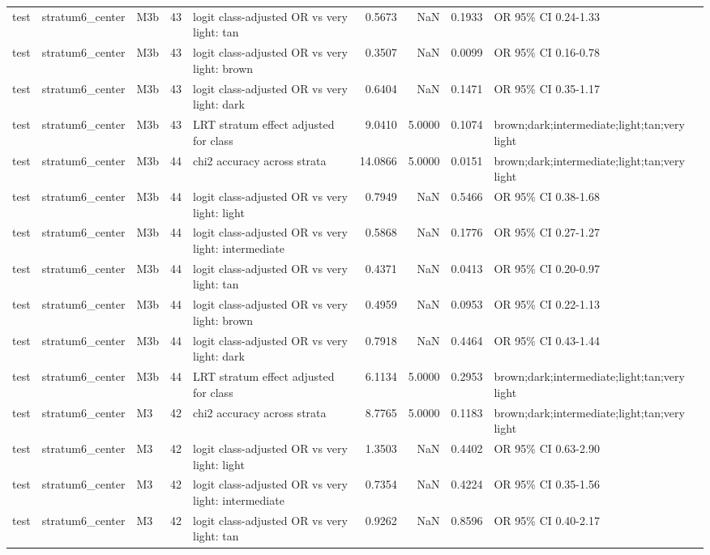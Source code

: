 \begin{tabular}{lllrlrrrl}
test & stratum6\_center & M3b & 43 & logit class-adjusted OR vs very light: tan & 0.5673 & NaN & 0.1933 & OR 95\% CI 0.24-1.33 \\
test & stratum6\_center & M3b & 43 & logit class-adjusted OR vs very light: brown & 0.3507 & NaN & 0.0099 & OR 95\% CI 0.16-0.78 \\
test & stratum6\_center & M3b & 43 & logit class-adjusted OR vs very light: dark & 0.6404 & NaN & 0.1471 & OR 95\% CI 0.35-1.17 \\
test & stratum6\_center & M3b & 43 & LRT stratum effect adjusted for class & 9.0410 & 5.0000 & 0.1074 & brown;dark;intermediate;light;tan;very light \\
test & stratum6\_center & M3b & 44 & chi2 accuracy across strata & 14.0866 & 5.0000 & 0.0151 & brown;dark;intermediate;light;tan;very light \\
test & stratum6\_center & M3b & 44 & logit class-adjusted OR vs very light: light & 0.7949 & NaN & 0.5466 & OR 95\% CI 0.38-1.68 \\
test & stratum6\_center & M3b & 44 & logit class-adjusted OR vs very light: intermediate & 0.5868 & NaN & 0.1776 & OR 95\% CI 0.27-1.27 \\
test & stratum6\_center & M3b & 44 & logit class-adjusted OR vs very light: tan & 0.4371 & NaN & 0.0413 & OR 95\% CI 0.20-0.97 \\
test & stratum6\_center & M3b & 44 & logit class-adjusted OR vs very light: brown & 0.4959 & NaN & 0.0953 & OR 95\% CI 0.22-1.13 \\
test & stratum6\_center & M3b & 44 & logit class-adjusted OR vs very light: dark & 0.7918 & NaN & 0.4464 & OR 95\% CI 0.43-1.44 \\
test & stratum6\_center & M3b & 44 & LRT stratum effect adjusted for class & 6.1134 & 5.0000 & 0.2953 & brown;dark;intermediate;light;tan;very light \\
test & stratum6\_center & M3 & 42 & chi2 accuracy across strata & 8.7765 & 5.0000 & 0.1183 & brown;dark;intermediate;light;tan;very light \\
test & stratum6\_center & M3 & 42 & logit class-adjusted OR vs very light: light & 1.3503 & NaN & 0.4402 & OR 95\% CI 0.63-2.90 \\
test & stratum6\_center & M3 & 42 & logit class-adjusted OR vs very light: intermediate & 0.7354 & NaN & 0.4224 & OR 95\% CI 0.35-1.56 \\
test & stratum6\_center & M3 & 42 & logit class-adjusted OR vs very light: tan & 0.9262 & NaN & 0.8596 & OR 95\% CI 0.40-2.17 \\

\end{tabular}
